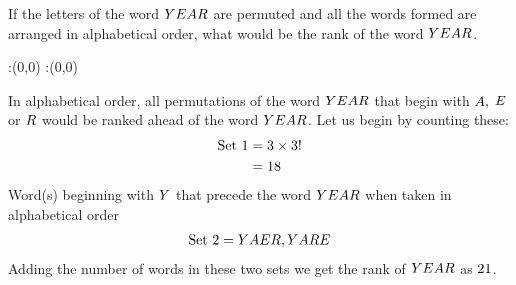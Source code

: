


\question[3] If the letters of the word $YEAR$ are permuted and all the
 words formed are arranged in alphabetical order, what would be the rank of 
 the word $YEAR$.



\watchout

\ifprintanswers
  \begin{marginfigure}
      :(0,0)
      :(0,0)
    \figdrawbegin{}
      \figdrawline [100,101]
    \figdrawend
    \figvisu{\figBoxA}{}{%
    }
    \centerline{\box\figBoxA}
  \end{marginfigure}
\fi 

\begin{solution}[\mcq]
  In alphabetical order, all permutations of the word $YEAR$ that begin
  with $A,$ $E$ or $R$ would be ranked ahead of the word
  $YEAR$. Let us begin by counting these:
  \begin{align}
    \text{Set 1} &= 3 \times 3! \nonumber \\
                 &= 18
  \end{align}
  Word(s) beginning with $Y$ that precede the word $YEAR$ when taken
  in alphabetical order
  \begin{align}
    \text{Set 2} = YAER, YARE
  \end{align}
  Adding the number of words in these two sets we get the rank of $YEAR$ 
  as $21$.
\end{solution}
